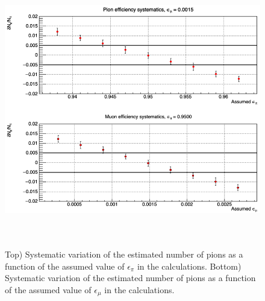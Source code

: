 \documentclass[12pt]{article}
\begin{document}
\begin{figure}[tbph]
\begin{center}
\includegraphics[height=12cm,clip=true]{cpp_systematics_lpi025_lmu005_c4}
\caption{Top) Systematic variation of the estimated number of pions as a function of the assumed value of $\epsilon_\pi$ in the calculations.
Bottom) Systematic variation of the estimated number of pions as a function of the assumed value of $\epsilon_\mu$ in the calculations.\label{fig:cpp_systematics_lpi025_lmu005_c4}}
\end{center}
\end{figure} 




\end{document}
